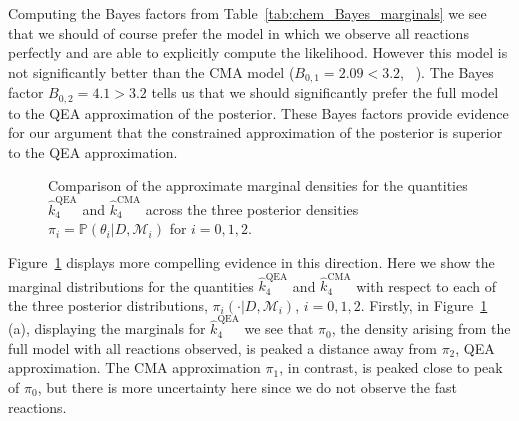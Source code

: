 \documentclass[final]{siamltex}
\newcommand{\edit}[1]{#1}
\begin{document}
Computing the Bayes factors from Table~\ref{tab:chem_Bayes_marginals}
we see that we should of course prefer the model \edit{ in
which we observe all reactions perfectly and are able to explicitly
compute the likelihood}. However this model is not
significantly better than the CMA model ($B_{0,1} = 2.09 < 3.2$,
~\cite{kass1995bayes}). The Bayes factor $B_{0,2} = 4.1 > 3.2$ tells
us that we should significantly prefer the full model to the QEA
approximation of the posterior. These Bayes factors provide evidence
for our
argument that the constrained approximation of the posterior is
superior to the QEA approximation. 

\begin{figure}[!htb]
\centering
{}
\caption{Comparison of the approximate marginal densities for the
  quantities $\hat{k}_4^{\text{QEA}}$ and $\hat{k}_4^{\text{CMA}}$
  across the three posterior densities $\pi_i = \mathbb{P}(\theta_i|D,\mathcal{M}_i)$ for $i = 0, 1, 2$.}
\label{fig:chem_model_comp}
\end{figure}

Figure~\ref{fig:chem_model_comp} displays more compelling evidence in
this direction. Here we show the marginal distributions for the
quantities $\hat{k}_4^{\text{QEA}}$ and $\hat{k}_4^{\text{CMA}}$ with
respect to each of the three posterior distributions, $\pi_i(\cdot|D,
\mathcal{M}_i)$, $i = 0, 1, 2$. Firstly, in
Figure~\ref{fig:chem_model_comp} (a), displaying the marginals for
$\hat{k}_4^{\text{QEA}}$ we see that $\pi_0$, the density arising from
the full model with all reactions observed, is peaked a distance away
from $\pi_2$, QEA approximation. The CMA approximation $\pi_1$, in contrast, is
peaked close to peak of $\pi_0$, but there is more uncertainty here
since we do not observe the fast reactions.
\end{document}
